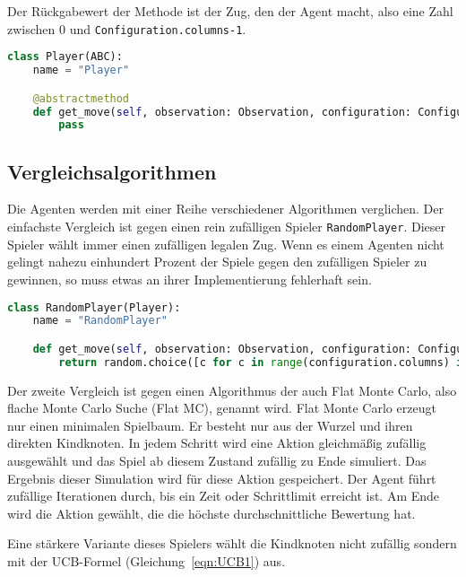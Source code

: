 Der Rückgabewert der Methode ist der Zug, den der Agent macht, also eine Zahl zwischen 0 und \verb|Configuration.columns-1|.

\begin{lstlisting}[language=Python,caption=Die Basisklasse aller Agenten.,label={lst:baseplayer}]
class Player(ABC):
    name = "Player"

    @abstractmethod
    def get_move(self, observation: Observation, configuration: Configuration) -> int:
        pass
\end{lstlisting}

\subsection{Vergleichsalgorithmen}
\label{chap:vergleiche-impl}

Die Agenten werden mit einer Reihe verschiedener Algorithmen verglichen.
Der einfachste Vergleich ist gegen einen rein zufälligen Spieler \verb|RandomPlayer|.
Dieser Spieler wählt immer einen zufälligen legalen Zug.
Wenn es einem Agenten nicht gelingt nahezu einhundert Prozent der Spiele gegen den zufälligen Spieler zu gewinnen, so muss etwas an ihrer Implementierung fehlerhaft sein.

\begin{lstlisting}[language=Python,caption=Ein Spieler der zufällige Züge wählt.,label={lst:randomplayer}]
class RandomPlayer(Player):
    name = "RandomPlayer"

    def get_move(self, observation: Observation, configuration: Configuration) -> int:
        return random.choice([c for c in range(configuration.columns) if observation.board[c] == 0])
\end{lstlisting}

Der zweite Vergleich ist gegen einen Algorithmus der auch Flat Monte Carlo, also flache Monte Carlo Suche (Flat MC), genannt wird.
Flat Monte Carlo erzeugt nur einen minimalen Spielbaum.
Er besteht nur aus der Wurzel und ihren direkten Kindknoten.
In jedem Schritt wird eine Aktion gleichmäßig zufällig ausgewählt und das Spiel ab diesem Zustand zufällig zu Ende simuliert.
Das Ergebnis dieser Simulation wird für diese Aktion gespeichert.
Der Agent führt zufällige Iterationen durch, bis ein Zeit oder Schrittlimit erreicht ist.
Am Ende wird die Aktion gewählt, die die höchste durchschnittliche Bewertung hat.

Eine stärkere Variante dieses Spielers wählt die Kindknoten nicht zufällig sondern mit der UCB-Formel (Gleichung~\ref{eqn:UCB1}) aus.


